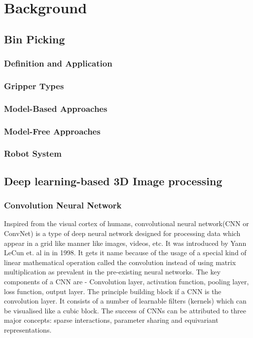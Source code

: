 \section{Background}
\subsection{Bin Picking}
\subsubsection{Definition and Application}
\subsubsection{Gripper Types}
\subsubsection{Model-Based Approaches}
\subsubsection{Model-Free Approaches}
\subsubsection{Robot System}
\subsection{Deep learning-based 3D Image processing}
\subsubsection{Convolution Neural Network}
Inspired from the visual cortex of humans, convolutional neural network(\ac{CNN} or ConvNet) is a type of deep neural network designed for processing data which appear in a grid like manner like images, videos, etc.  It was introduced by Yann LeCun et. al in \cite{lecun1998gradient} in 1998.  It gets it name because of the usage of a special kind of linear mathematical operation called the convolution instead of using matrix multiplication as prevalent in the pre-existing neural networks. The key components of a \ac{CNN} are - Convolution layer, activation function, pooling layer, loss function, output layer. The principle building block if a CNN is the convolution layer. It consists of a number of learnable filters (kernels) which can be visualised like a cubic block. The success of \ac{CNN}s can be attributed to three major concepts: sparse interactions, parameter sharing and equivariant representations.

